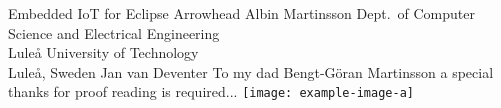\documentclass[12pt,a4paper,openright,final,twoside,ieeetran]{main}
\begin{document}
{\parskip=0pt
\def\thesistitle{Embedded IoT for Eclipse Arrowhead}
\def\theauthor{Albin Martinsson}
\def\theaddress{Dept.\ of Computer Science and Electrical Engineering\\
Lule{\aa} University of Technology\\ Lule{\aa}, Sweden}

\def\supervisors{Jan van Deventer}
\def\supervisorstring{Supervisor:} %
\def\dedication{To my dad Bengt-Göran Martinsson a special thanks for proof reading is required...}

\def\theabstract{}
\def\thepreface{}



\def\thelogo{\texttt{[image: example-image-a]} \\ \vspace{1cm}} %


\startpreamble
  {\thesistitle}
  {\theauthor}
  {\theaddress}
  {\supervisors}
  {\dedication}
  {\theabstract}
  {\thepreface}
  {\thelogo}
}
\end{document}
